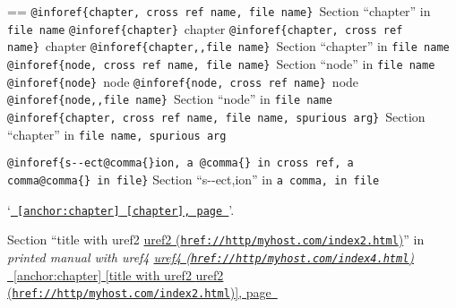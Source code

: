 \documentclass{book}
\makeatletter
\newenvironment{GNUTexinfopreformatted}{%
  \par\GNUTobeylines\obeyspaces\frenchspacing
  \parskip=\z@\parindent=\z@}{}
{\catcode`\^^M=13 \gdef\GNUTobeylines{\catcode`\^^M=13 \def^^M{\null\par}}}
\newenvironment{GNUTexinfoindented}
  {\begin{list}{}{}
  \item\relax}
  {\end{list}}
\makeatother
\begin{document}
\begin{GNUTexinfoindented}
\begin{GNUTexinfopreformatted}
\texttt{@inforef\{chapter,\ cross ref name,\ file name\}}\ Section ``chapter'' in \texttt{file name}
\texttt{@inforef\{chapter\}}\ chapter
\texttt{@inforef\{chapter,\ cross ref name\}}\ chapter
\texttt{@inforef\{chapter{,}{,}file name\}}\ Section ``chapter'' in \texttt{file name}
\texttt{@inforef\{node,\ cross ref name,\ file name\}}\ Section ``node'' in \texttt{file name}
\texttt{@inforef\{node\}}\ node
\texttt{@inforef\{node,\ cross ref name\}}\ node
\texttt{@inforef\{node{,}{,}file name\}}\ Section ``node'' in \texttt{file name}
\texttt{@inforef\{chapter,\ cross ref name,\ file name,\ spurious arg\}}\ Section ``chapter'' in \texttt{file name,\ spurious arg}

\texttt{@inforef\{s{-}{-}ect@comma\{\}ion,\ a @comma\{\}\ in cross
ref,\ a comma@comma\{\}\ in file\}}
Section ``s{-}{-}ect,ion'' in \texttt{a comma,\ in file}

`\texttt{\hyperref[anchor:chapter]{\chaptername~\ref*{anchor:chapter} [chapter], page~\pageref*{anchor:chapter}}}'.

Section ``title with uref2 \href{href://http/myhost.com/index2.html}{uref2 (\nolinkurl{href://http/myhost.com/index2.html})}'' in \textsl{printed manual with uref4 \href{href://http/myhost.com/index4.html}{uref4 (\nolinkurl{href://http/myhost.com/index4.html})}}
\hyperref[anchor:chapter]{\chaptername~\ref*{anchor:chapter} [title with uref2 \href{href://http/myhost.com/index2.html}{uref2 (\nolinkurl{href://http/myhost.com/index2.html})}], page~\pageref*{anchor:chapter}}


\end{GNUTexinfopreformatted}
\end{GNUTexinfoindented}
\end{document}

